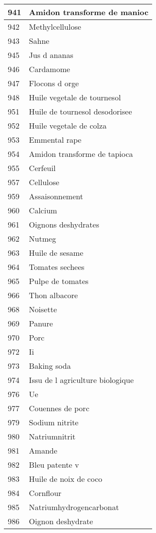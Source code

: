 \begin{longtable}{|l|l|}
941 & Amidon transforme de manioc \\ \hline 
942 & Methylcellulose \\ \hline 
943 & Sahne \\ \hline 
945 & Jus d ananas \\ \hline 
946 & Cardamome \\ \hline 
947 & Flocons d orge \\ \hline 
948 & Huile vegetale de tournesol \\ \hline 
951 & Huile de tournesol desodorisee \\ \hline 
952 & Huile vegetale de colza \\ \hline 
953 & Emmental rape \\ \hline 
954 & Amidon transforme de tapioca \\ \hline 
955 & Cerfeuil \\ \hline 
957 & Cellulose \\ \hline 
959 & Assaisonnement \\ \hline 
960 & Calcium \\ \hline 
961 & Oignons deshydrates \\ \hline 
962 & Nutmeg \\ \hline 
963 & Huile de sesame \\ \hline 
964 & Tomates sechees \\ \hline 
965 & Pulpe de tomates \\ \hline 
966 & Thon albacore \\ \hline 
968 & Noisette \\ \hline 
969 & Panure \\ \hline 
970 & Porc \\ \hline 
972 & Ii \\ \hline 
973 & Baking soda \\ \hline 
974 & Issu de l agriculture biologique \\ \hline 
976 & Ue \\ \hline 
977 & Couennes de porc \\ \hline 
979 & Sodium nitrite \\ \hline 
980 & Natriumnitrit \\ \hline 
981 & Amande \\ \hline 
982 & Bleu patente v \\ \hline 
983 & Huile de noix de coco \\ \hline 
984 & Cornflour \\ \hline 
985 & Natriumhydrogencarbonat \\ \hline 
986 & Oignon deshydrate \\ \hline 

\end{longtable}
